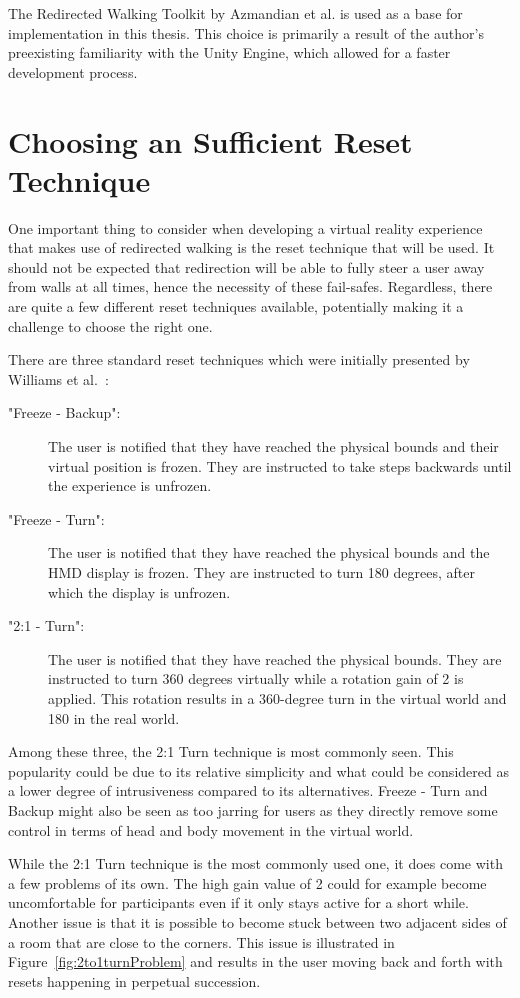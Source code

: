 The Redirected Walking Toolkit by Azmandian et al. is used as a base for implementation in this thesis. This choice is primarily a result of the author's preexisting familiarity with the Unity Engine, which allowed for a faster development process.

\section{Choosing an Sufficient Reset Technique}\label{sec:choosingTheRightReset}
One important thing to consider when developing a virtual reality experience that makes use of redirected walking is the reset technique that will be used. It should not be expected that redirection will be able to fully steer a user away from walls at all times, hence the necessity of these fail-safes. Regardless, there are quite a few different reset techniques available, potentially making it a challenge to choose the right one. 

There are three standard reset techniques which were initially presented by Williams et al.~\cite{williams2007exploring}:
\begin{description}
    \item["Freeze - Backup": ] The user is notified that they have reached the physical bounds and their virtual position is frozen. They are instructed to take steps backwards until the experience is unfrozen. 
    \item["Freeze - Turn": ] The user is notified that they have reached the physical bounds and the HMD display is frozen. They are instructed to turn 180 degrees, after which the display is unfrozen. 
    \item["2:1 - Turn": ] The user is notified that they have reached the physical bounds. They are instructed to turn 360 degrees virtually while a rotation gain of 2 is applied. This rotation results in a 360-degree turn in the virtual world and 180 in the real world.
\end{description}

Among these three, the 2:1 Turn technique is most commonly seen. This popularity could be due to its relative simplicity and what could be considered as a lower degree of intrusiveness compared to its alternatives. Freeze - Turn and Backup might also be seen as too jarring for users as they directly remove some control in terms of head and body movement in the virtual world.

While the 2:1 Turn technique is the most commonly used one, it does come with a few problems of its own. The high gain value of 2 could for example become uncomfortable for participants even if it only stays active for a short while. Another issue is that it is possible to become stuck between two adjacent sides of a room that are close to the corners. This issue is illustrated in Figure~\ref{fig:2to1turnProblem} and results in the user moving back and forth with resets happening in perpetual succession.  

